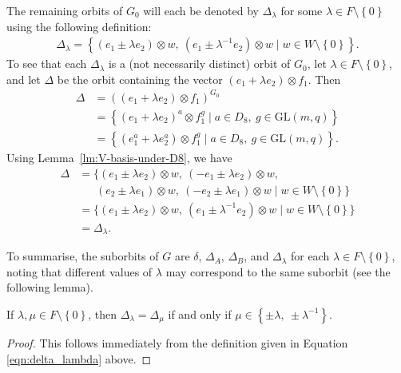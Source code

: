 \documentclass[ALCO, Unicode]{cedram}
\newcommand{\GL}{\mathrm{GL}}
\begin{document}
The remaining orbits of $G_0$ will each be denoted by $\Delta_\lambda$ for some $\lambda \in F \setminus \left\{0 \right\}$ using the following definition:
\begin{align} \label{eqn:delta_lambda}
\Delta_\lambda = {\left\{\left(e_1 \pm \lambda e_2 \right) \otimes w,\ \left(e_1 \pm \lambda^{-1} e_2 \right) \otimes w \mid w \in W \setminus \left\{0 \right\}\right\}}.
\end{align}
To see that each $\Delta_\lambda$ is a (not necessarily distinct) orbit of $G_0$, let $\lambda \in F \setminus \left\{0 \right\}$, and let $\Delta$ be the orbit containing the vector $\left(e_1 + \lambda e_2 \right) \otimes f_1$. Then
\begin{align*}
\Delta &= \left(\left(e_1 + \lambda e_2 \right) \otimes f_1 \right)^{G_0} \\
&= \left\{(e_1 + \lambda e_2)^a \otimes f_1^g \mid a \in D_8,\ g \in \GL{\left(m, q \right)}\right\} \\
&= {\left\{(e_1^a + \lambda e_2^a) \otimes f_1^g \mid a \in D_8,\ g \in \GL{\left(m, q \right)}\right\}}.
\end{align*}
Using Lemma~\ref{lm:V-basis-under-D8}, we have
\begin{align*}
\Delta &= \big\{{\left(e_1 \pm \lambda e_2 \right)} \otimes w,\ \left(-e_1 \pm \lambda e_2 \right) \otimes w, \\
&\ \ \ \ \ \ \ \left(e_2 \pm \lambda e_1 \right) \otimes w,\ \left(-e_2 \pm \lambda e_1 \right) \otimes w \mid w \in W \setminus {\left\{0 \right\}}\big\} \\
&= \big\{{\left(e_1 \pm \lambda e_2 \right)} \otimes w,\ \left(e_1 \pm \lambda^{-1} e_2 \right) \otimes w \mid w \in W \setminus {\left\{0 \right\}}\big\} \\
&= \Delta_\lambda.
\end{align*}

To summarise, the suborbits of $G$ are $\delta$, $\Delta_A$, $\Delta_B$, and $\Delta_\lambda$ for each $\lambda \in F \setminus \left\{0 \right\}$, noting that different values of $\lambda$ may correspond to the same suborbit (see the following lemma).

\begin{lemma} \label{lm:suborbit-equivalence}
If $\lambda, \mu \in F \setminus \left\{0 \right\}$, then $\Delta_\lambda = \Delta_\mu$ if and only if $\mu \in \left\{\pm \lambda,\ \pm \lambda^{-1} \right\}$.
\end{lemma}
\begin{proof}
This follows immediately from the definition given in Equation \eqref{eqn:delta_lambda} above.
\end{proof}
\end{document}
